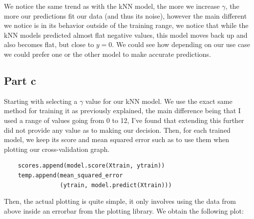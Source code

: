 \documentclass[10pt]{article}
\begin{document}
\begin{figure}[H]
\end{figure}


We notice the same trend as with the kNN model, the more we increase $\gamma$, the more our predictions fit our 
data (and thus its noise), however the main different we notice is in its behavior outside of the training range,
we notice that while the kNN models predicted almost flat negative values, this model moves back up and also becomes
flat, but close to $y = 0$. We could see how depending on our use case we could prefer one or the other model to
make accurate predictions. 

\subsection*{Part c}
Starting with selecting a $\gamma$ value for our kNN model. We use the exact same method for training it as previously
explained, the main difference being that I used a range of values going from 0 to 12, I've found that extending this further
did not provide any value as to making our decision. Then, for each trained model, we keep its score and mean squared error such
as to use them when plotting our cross-validation graph.

\begin{lstlisting}
    scores.append(model.score(Xtrain, ytrain))
    temp.append(mean_squared_error
                (ytrain, model.predict(Xtrain)))
\end{lstlisting}

Then, the actual plotting is quite simple, it only involves using the data from above inside an errorbar from the plotting
library. We obtain the following plot:
\end{document}
